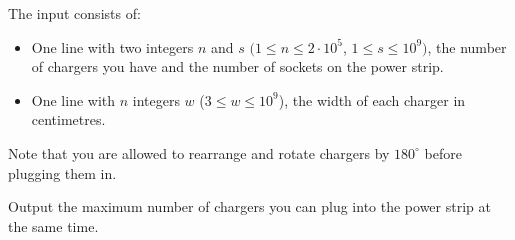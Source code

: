 \begin{Input}
The input consists of:
\begin{itemize}
\item
One line with two integers $n$ and $s$ $(1\leq n\leq2\cdot 10^5$,  $1\leq s\leq10^9)$, the number of chargers you have and the number of sockets on the power strip.
\item
One line with $n$ integers $w$ ($3\leq w\leq10^9$),
the width of each charger in centimetres.
\end{itemize}
Note that you are allowed to rearrange and rotate chargers by $180^\circ$ before plugging them in.
\end{Input}

\begin{Output}
Output the maximum number of chargers you can plug into the power strip at the same time.
\end{Output}
